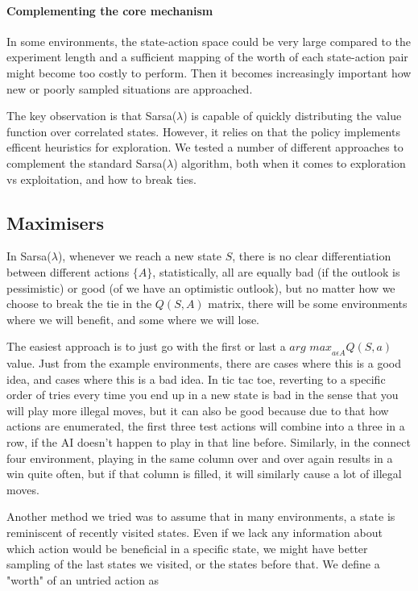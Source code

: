 \paragraph{Complementing the core mechanism}
In some environments, the state-action space could be very large compared to the
experiment length and a sufficient mapping of the worth of each state-action
pair might become too costly to perform. Then it becomes increasingly important
how new or poorly sampled situations are approached.

The key observation is that Sarsa($\lambda$) is capable of quickly distributing
the value function over correlated states. However, it relies on that the policy
implements efficent heuristics for exploration. We tested a number of different
approaches to complement the standard Sarsa($\lambda$) algorithm, both when it
comes to exploration vs exploitation, and how to break ties. 

\subsection{Maximisers}
In Sarsa($\lambda$), whenever we reach a new state $S$, there is no clear
differentiation between different actions $\{A\}$, statistically, all are
equally bad (if the outlook is pessimistic) or good (of we have an optimistic
outlook), but no matter how we choose to break the tie in the $Q(S,A)$ matrix,
there will be some environments where we will benefit, and some where we will
lose.

The easiest approach is to just go with the first or last a $\textit{arg
    max}_{a\epsilon A} Q(S,a)$ value. Just from the example environments, there
are cases where this is a good idea, and cases where this is a bad idea. In tic
tac toe, reverting to a specific order of tries every time you end up in a new
state is bad in the sense that you will play more illegal moves, but it can also
be good because due to that how actions are enumerated, the first three test
actions will combine into a three in a row, if the AI doesn't happen to play in
that line before. Similarly, in the connect four environment, playing in the
same column over and over again results in a win quite often, but if that column
is filled, it will similarly cause a lot of illegal moves.

Another method we tried was to assume that in many environments, a state is
reminiscent of recently visited states. Even if we lack any information about
which action would be beneficial in a specific state, we might have better
sampling of the last states we visited, or the states before that. We define a
"worth" of an untried action as

